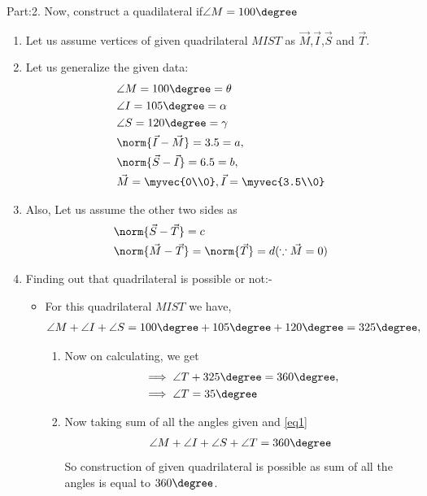 \documentclass[journal,12pt,twocolumn]{IEEEtran}
\begin{document}
Part:2.
Now, construct a quadilateral if$\angle M=100\degree$
\begin{enumerate}
\item Let us assume vertices of given quadrilateral $MIST$ as $\vec{M}$,$\vec{I}$,$\vec{S}$ and $\vec{T}$.
\item Let us generalize the given data:
    \begin{align}
    &\angle M= 100\degree=\theta \label{eq1}
    \\
    &\angle I= 105\degree=\alpha
    \\
    &\angle S= 120\degree=\gamma \label{eq2}
    \\
    &\norm{\vec{I}-\vec{M}} =3.5=a, \label{eq3}
    \\
    &\norm{\vec{S}-\vec{I}} =6.5=b,\label{eq4}
    \\
    &\vec{M}=\myvec{0\\0}, \vec{I}=\myvec{3.5\\0}
    \end{align}
\item Also, Let us assume the other two sides as
\begin{align}
 &\norm{\vec{S}-\vec{T}}=c \label{eq5}
 \\
  &\norm{\vec{M}-\vec{T}}=\norm{\vec{T}} =d \label{eq6} (\because \vec{M}=0)
\end{align} 
\item Finding out that quadrilateral is possible or not:-
\begin{itemize}
\item For this quadrilateral $MIST$ we have,
\begin{align}
\angle M +\angle I +\angle S=100\degree + 105\degree+120\degree =325\degree,
\end{align}
    \begin{enumerate}
    \item Now on calculating, we get
\begin{align}
&\implies \angle T + 325\degree  = 360\degree,
\\
&\implies \angle T = 35\degree\label{eq1}
\end{align}
 \item Now taking sum of all the angles given and \eqref{eq1}  
\begin{align}
\angle M + \angle I +\angle S +\angle T =360\degree
\end{align}
So construction of given quadrilateral is possible as sum of all the angles is equal to $360\degree$.
\\

\end{enumerate}
\end{itemize}
\end{enumerate}
\end{document}
